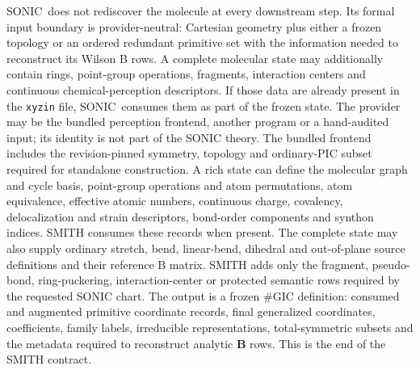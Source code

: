 \documentclass[journal=jctcce,manuscript=article,layout=traditional]{achemso}
\newcommand{\SONIC}{SONIC}
\newcommand{\Bmat}{\mathbf{B}}
\theoremstyle{definition}
\begin{document}
\SONIC\ does not rediscover the molecule at every downstream step.  Its formal
input boundary is provider-neutral: Cartesian geometry plus either a frozen
topology or an ordered redundant primitive set with the information needed to
reconstruct its Wilson B rows.  A complete molecular state may additionally
contain rings, point-group operations, fragments, interaction centers and
continuous chemical-perception descriptors.  If those data are already
present in the \texttt{xyzin} file, \SONIC\ consumes them as part of the frozen
state.  The provider may be the bundled perception frontend, another program or a
hand-audited input; its identity is not part of the SONIC theory.  The bundled
frontend includes the revision-pinned symmetry, topology and ordinary-PIC
subset required for standalone construction.  A rich state
can define the molecular graph and cycle basis, point-group operations and atom
permutations, atom equivalence, effective atomic numbers, continuous charge,
covalency, delocalization and strain descriptors, bond-order components and
synthon indices.  SMITH consumes these records when present.  The complete
state may also supply ordinary stretch, bend, linear-bend, dihedral and
out-of-plane source definitions and their reference B matrix.  SMITH adds only
the fragment, pseudo-bond, ring-puckering, interaction-center or protected
semantic rows required by the requested SONIC chart.
The output is a frozen \(\#\)GIC definition: consumed and augmented primitive coordinate records,
final generalized coordinates, coefficients, family labels, irreducible
representations, total-symmetric subsets and the metadata required to
reconstruct analytic \(\Bmat\) rows.  This is the end of the SMITH contract.
\end{document}
